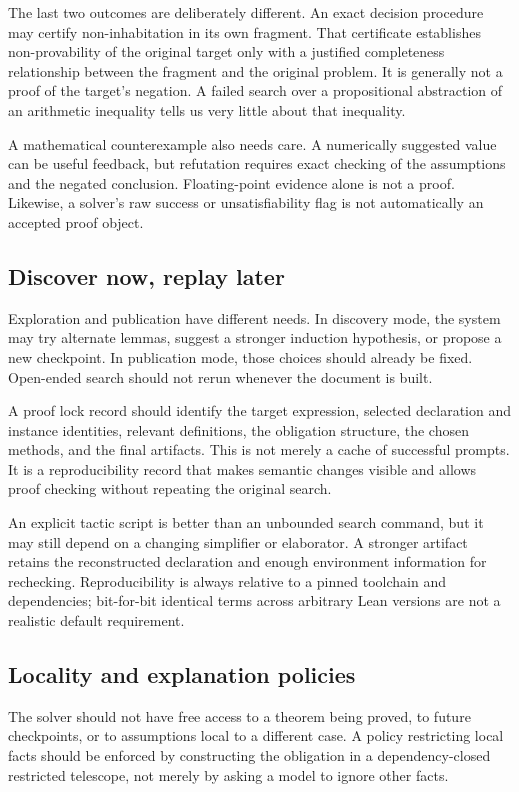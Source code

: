\documentclass[11pt,a4paper]{article}
\theoremstyle{definition}
\theoremstyle{remark}
\begin{document}
The last two outcomes are deliberately different. An exact decision procedure may certify non-inhabitation in its own fragment. That certificate establishes non-provability of the original target only with a justified completeness relationship between the fragment and the original problem. It is generally not a proof of the target's negation. A failed search over a propositional abstraction of an arithmetic inequality tells us very little about that inequality.

A mathematical counterexample also needs care. A numerically suggested value can be useful feedback, but refutation requires exact checking of the assumptions and the negated conclusion. Floating-point evidence alone is not a proof. Likewise, a solver's raw success or unsatisfiability flag is not automatically an accepted proof object.

\subsection{Discover now, replay later}
Exploration and publication have different needs. In discovery mode, the system may try alternate lemmas, suggest a stronger induction hypothesis, or propose a new checkpoint. In publication mode, those choices should already be fixed. Open-ended search should not rerun whenever the document is built.

A proof lock record should identify the target expression, selected declaration and instance identities, relevant definitions, the obligation structure, the chosen methods, and the final artifacts. This is not merely a cache of successful prompts. It is a reproducibility record that makes semantic changes visible and allows proof checking without repeating the original search.

An explicit tactic script is better than an unbounded search command, but it may still depend on a changing simplifier or elaborator. A stronger artifact retains the reconstructed declaration and enough environment information for rechecking. Reproducibility is always relative to a pinned toolchain and dependencies; bit-for-bit identical terms across arbitrary Lean versions are not a realistic default requirement.

\subsection{Locality and explanation policies}
The solver should not have free access to a theorem being proved, to future checkpoints, or to assumptions local to a different case. A policy restricting local facts should be enforced by constructing the obligation in a dependency-closed restricted telescope, not merely by asking a model to ignore other facts.
\end{document}
